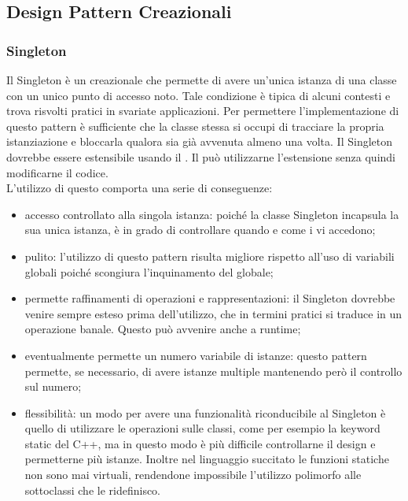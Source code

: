 \documentclass[12pt,a4paper]{article}
\begin{document}
\subsection{Design Pattern Creazionali}
\subsubsection{Singleton}
Il Singleton è un  creazionale che permette di avere un’unica istanza di una classe con un unico punto di accesso noto. Tale condizione è tipica di alcuni contesti e trova risvolti pratici in svariate applicazioni. Per permettere l’implementazione di questo pattern è sufficiente che la classe stessa si occupi di tracciare la propria istanziazione e bloccarla qualora sia già avvenuta almeno una volta. Il Singleton dovrebbe essere estensibile usando il . Il  può utilizzarne l’estensione senza quindi modificarne il codice.\\
L’utilizzo di questo  comporta una serie di conseguenze:
\begin{itemize}
	\item accesso controllato alla singola istanza: poiché la classe Singleton incapsula la sua unica istanza, è in grado di controllare quando e come i  vi accedono;
	\item {} pulito: l’utilizzo di questo pattern risulta migliore rispetto all’uso di variabili globali poiché scongiura l’inquinamento del  globale;
	\item permette raffinamenti di operazioni e rappresentazioni: il Singleton dovrebbe venire sempre esteso prima dell’utilizzo, che in termini pratici si traduce in un operazione banale. Questo può avvenire anche a runtime;
	\item eventualmente permette un numero variabile di istanze: questo pattern permette, se necessario, di avere istanze multiple mantenendo però il controllo sul numero;
	\item flessibilità: un modo per avere una funzionalità riconducibile al Singleton è quello di utilizzare le operazioni sulle classi, come per esempio la keyword static del C++, ma in questo modo è più difficile controllarne il design e permetterne più istanze. Inoltre nel linguaggio succitato le funzioni statiche non sono mai virtuali, rendendone impossibile l’utilizzo polimorfo alle sottoclassi che le ridefinisco.
\end{itemize}
\end{document}
